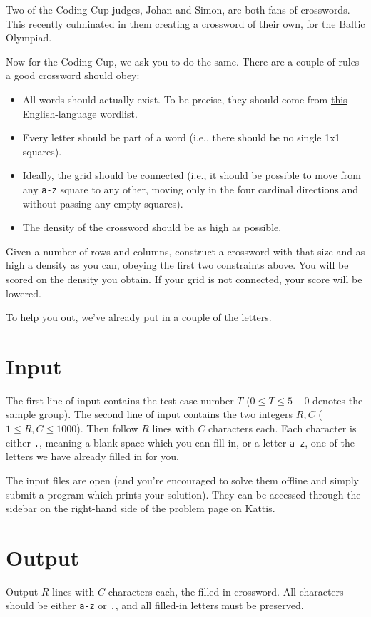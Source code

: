 Two of the Coding Cup judges, Johan and Simon, are both fans of crosswords.
This recently culminated in them creating a \href{http://boi2018.progolymp.se/day4.pdf}{crossword of their own},
for the Baltic Olympiad.

Now for the Coding Cup, we ask you to do the same. There are a couple of rules a good crossword should obey:
\begin{itemize}
  \item All words should actually exist. To be precise, they should come from \href{http://codingcup.se/2018/wordlist.txt}{this} English-language wordlist.
  \item Every letter should be part of a word (i.e., there should be no single 1x1 squares).
  \item Ideally, the grid should be connected (i.e., it should be possible to move from any \texttt{a-z} square to any other,
    moving only in the four cardinal directions and without passing any empty squares).
  \item The density of the crossword should be as high as possible.
\end{itemize}

Given a number of rows and columns, construct a crossword with that size and as high a
density as you can, obeying the first two constraints above.
You will be scored on the density you obtain.
If your grid is not connected, your score will be lowered.

To help you out, we've already put in a couple of the letters.

\section*{Input}
The first line of input contains the test case number $T$ ($0 \le T \le 5$ -- $0$ denotes the sample group).
The second line of input contains the two integers $R, C$ ($1 \le R, C \le 1000$).
Then follow $R$ lines with $C$ characters each. Each character is either \texttt{.},
meaning a blank space which you can fill in, or a letter \texttt{a-z}, one of the
letters we have already filled in for you.

The input files are open (and you're encouraged to solve them offline and simply
submit a program which prints your solution). They can be accessed through the
sidebar on the right-hand side of the problem page on Kattis.

\section*{Output}
Output $R$ lines with $C$ characters each, the filled-in crossword.
All characters should be either \texttt{a-z} or \texttt{.}, and all filled-in
letters must be preserved.

